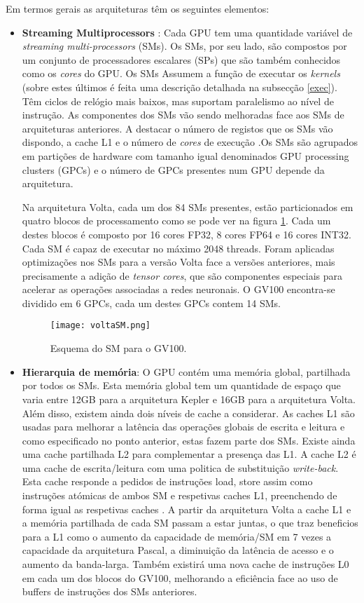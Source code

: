Em termos gerais as arquiteturas têm os seguintes elementos:
\begin{itemize}
\item \textbf{Streaming Multiprocessors} : Cada GPU tem uma quantidade variável de \textit{streaming multi-processors} (SMs). Os SMs, por seu lado, são compostos por um conjunto de processadores escalares (SPs) que são também conhecidos como os \textit{cores} do GPU. Os SMs Assumem a função de executar os \textit{kernels} (sobre estes últimos é feita uma descrição detalhada na subsecção \ref{exec}). Têm ciclos de relógio mais baixos, mas suportam paralelismo ao nível de instrução. As componentes dos SMs vão sendo melhoradas face aos SMs de arquiteturas anteriores. A destacar o número de registos que os SMs vão dispondo, a cache L1 e o número de \textit{cores} de execução \cite{wilt_2013}.Os SMs são agrupados em partições de hardware com tamanho igual denominados GPU processing clusters (GPCs) e o número de GPCs presentes num GPU depende da arquitetura.  \par
Na arquitetura Volta, cada um dos 84 SMs presentes, estão particionados em quatro blocos de processamento como se pode ver na figura \ref{voltaSM}. Cada um destes blocos é composto por 16 cores FP32, 8 cores FP64 e 16 cores INT32. Cada SM é capaz de executar no máximo 2048 threads. Foram aplicadas optimizações nos SMs para a versão Volta face a versões anteriores, mais precisamente a adição de \textit{tensor cores}, que são componentes especiais para acelerar as operações associadas a redes neuronais. O GV100 encontra-se dividido em 6 GPCs, cada um destes GPCs contem 14 SMs.
 \begin{figure}[ht]
  \centering
    {\texttt{[image: voltaSM.png]}}
  \caption{Esquema do SM para o GV100\cite{voltaArch}.}
  \label{voltaSM}
 \end{figure}
%
\item \textbf{Hierarquia de memória}: O GPU contém uma memória global, partilhada por todos os SMs. Esta memória global tem um quantidade de espaço que varia entre 12GB para a arquitetura Kepler e 16GB para a arquitetura Volta.  Além disso, existem ainda dois níveis de cache a considerar. As caches L1 são usadas para melhorar a latência das operações globais de escrita e leitura e como especificado no ponto anterior, estas fazem parte dos SMs. Existe ainda uma cache partilhada L2 para complementar a presença das L1. A cache L2 é uma cache de escrita/leitura com uma politica de substituição \textit{write-back}. Esta cache responde a pedidos de instruções load, store assim como instruções atómicas de ambos SM e respetivas caches L1, preenchendo de forma igual as respetivas caches \cite{nickolls2010gpu}. A partir da arquitetura Volta a cache L1 e a memória partilhada de cada SM passam a estar juntas, o que traz beneficios para a L1 como o aumento da capacidade de memória/SM em 7 vezes a capacidade da arquitetura Pascal, a diminuição da latência de acesso e o aumento da banda-larga\cite{voltaArch}.  Também existirá uma nova cache de instruções L0 em cada um dos blocos do GV100, melhorando a eficiência face ao uso de buffers de instruções dos SMs anteriores. 

\end{itemize}
